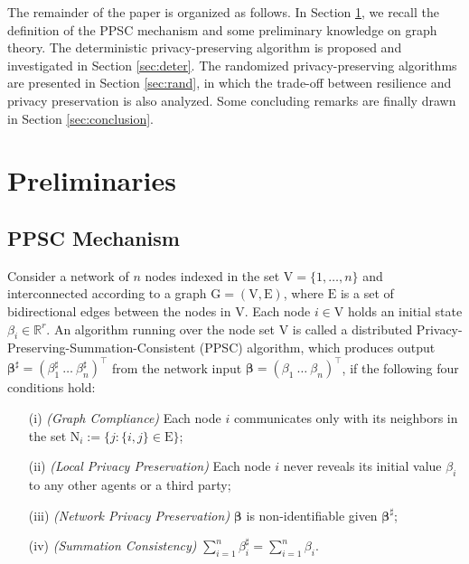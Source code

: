 \documentclass[a4paper, 11pt]{article}
\newcommand{\R}{\mathbb{R}}
\newcommand{\1}{\mathbf{1}}
\newcommand{\mV}{\mathrm{V}}
\newcommand{\betab}{\bm{\beta}}
\begin{document}
 The remainder of the paper is organized as follows. In Section \ref{sec:ppsc}, we recall the definition of the PPSC mechanism and some preliminary knowledge on graph theory.   The deterministic privacy-preserving algorithm is proposed and investigated  in Section \ref{sec:deter}.  The randomized privacy-preserving algorithms are presented in Section \ref{sec:rand}, in which the trade-off between resilience and privacy preservation is also analyzed. Some concluding remarks are finally drawn in Section \ref{sec:conclusion}.















\section{Preliminaries}\label{sec:ppsc}
\subsection{PPSC Mechanism}
Consider a network of $n$ nodes  indexed in the set $\mathrm{V}=\{1,\dots,n\}$ and interconnected according to a  graph $\mathrm{G}=(\mathrm{V},\mathrm{E})$, where $\mathrm{E}$ is a set of bidirectional edges between the nodes in $\mathrm{V}$. Each node $i\in\mV$ holds an initial state $\beta_i\in\R^r$.  An algorithm running over the node set $\mathrm{V}$ is called a distributed Privacy-Preserving-Summation-Consistent (PPSC) algorithm, which produces output $\betab^\sharp=(\beta_1^{\sharp}\ \dots\ \beta_n^{\sharp})^\top$ from the network input $\betab=(\beta_1\ \dots\ \beta_n)^\top$, if the following four conditions hold:
\begin{itemize}
	\item [(i)] {\em (Graph Compliance)} Each node $i$ communicates only  with its neighbors in the set $\mathrm{N}_i:=\big\{j:\{i,j\}\in\mathrm{E}\big\}$;
	\item[(ii)] {\em (Local Privacy Preservation)} Each node $i$ never reveals its initial value $\beta_i$ to any other agents or a third party;
	\item[(iii)] {\em (Network Privacy Preservation)} $\betab$ is non-identifiable given $\betab^\sharp$;
	\item[(iv)] {\em (Summation Consistency)} $\sum\limits_{i=1}^n \beta^{\sharp}_i=\sum\limits_{i=1}^n \beta_i$.
\end{itemize}
\end{document}
